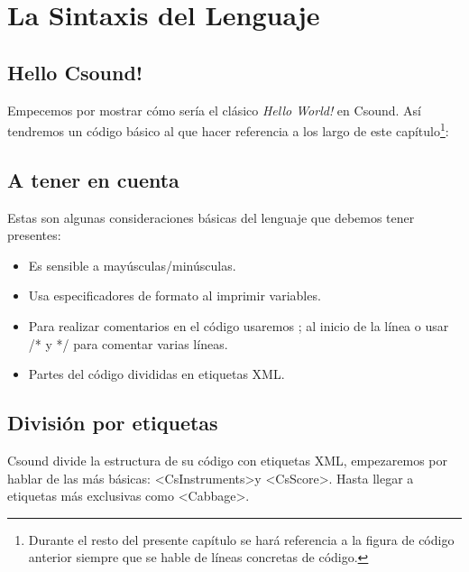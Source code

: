 
\chapter{La Sintaxis del Lenguaje}

\section{Hello Csound!}\label{sec:hello}

Empecemos por mostrar cómo sería el clásico \textsl{Hello World!} en Csound. Así tendremos un código básico al que hacer referencia a los largo de este capítulo\footnote{Durante el resto del presente capítulo se hará referencia a la figura de código anterior siempre que se hable de líneas concretas de código.}:

\section{A tener en cuenta}\label{sec:cuenta}

Estas son algunas consideraciones básicas del lenguaje que debemos tener presentes:
\begin{itemize}
 \item Es sensible a mayúsculas/minúsculas.
 \item Usa especificadores de formato al imprimir variables.
 \item Para realizar comentarios en el código usaremos ; al inicio de la línea o usar /* y */ para comentar varias líneas.
 \item Partes del código divididas en etiquetas XML.
\end{itemize}

\section{División por etiquetas}\label{sec:etq}

Csound divide la estructura de su código con etiquetas XML, empezaremos por hablar de las más básicas: \textless CsInstruments\textgreater y \textless CsScore\textgreater. Hasta llegar a etiquetas más exclusivas como \textless Cabbage\textgreater.

